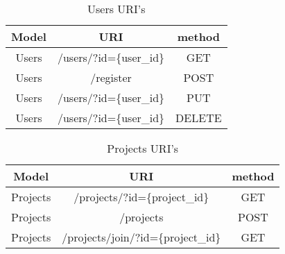 \begin{table}[]
\centering
\begin{tabular}{|c|c|c|}
\hline
\rowcolor[HTML]{32CB00} 
\textbf{Model} & \textbf{URI}                                                     & \textbf{method}                                     \\ \hline
\rowcolor[HTML]{FFFFFF} 
Users          & /users/?id=\{user\_id\}                                              & GET                                                 \\ \hline
\rowcolor[HTML]{67FD9A} 
Users          & /register                                                        & POST                                                \\ \hline
\rowcolor[HTML]{FFFFFF} 
Users          & /users/?id=\{user\_id\}                                              & PUT                                                 \\ \hline
\rowcolor[HTML]{67FD9A} 
Users          & \multicolumn{1}{l|}{\cellcolor[HTML]{67FD9A}/users/?id=\{user\_id\}} & \multicolumn{1}{l|}{\cellcolor[HTML]{67FD9A}DELETE} \\ \hline
\end{tabular}
\caption{Users URI's}
\label{usersURI}
\end{table}



\begin{table}[]
\centering
\begin{tabular}{|c|c|c|}
\hline
\rowcolor[HTML]{32CB00} 
\textbf{Model} & \textbf{URI}                   & \textbf{method} \\ \hline
\rowcolor[HTML]{FFFFFF} 
Projects       & /projects/?id=\{project\_id\}      & GET             \\ \hline
\rowcolor[HTML]{67FD9A} 
Projects       & /projects                      & POST            \\ \hline
\rowcolor[HTML]{FFFFFF} 
Projects       & /projects/join/?id=\{project\_id\} & GET             \\ \hline
\end{tabular}
\caption{Projects URI's}
\label{projectsURI}
\end{table}


